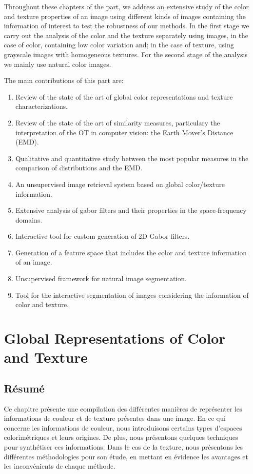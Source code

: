 Throughout these chapters of the part, we address an extensive study of the color and texture properties of an image using different kinds of images containing the information of interest to test the robustness of our methods. In the first stage we carry out the analysis of the color and the texture separately using images, in the case of color, containing low color variation and; in the case of texture, using grayscale images with homogeneous textures. For the second stage of the analysis we mainly use natural color images. 

The main contributions of this part are:

\begin{enumerate}
	\item Review of the state of the art of global color representations and texture characterizations.
	\item Review of the state of the art of similarity measures, particulary the interpretation of the OT in computer vision: the Earth Mover's Distance (EMD).
	\item Qualitative and quantitative study between the most popular measures in the comparison of distributions and the EMD. 
	\item An unsupervised image retrieval system based on global color/texture information.
	\item Extensive analysis of gabor filters and their properties in the space-frequency domains.
	\item Interactive tool for custom generation of 2D Gabor filters.
	\item Generation of a feature space that includes the color and texture information of an image.
	\item Unsupervised framework for natural image segmentation.
	\item Tool for the interactive segmentation of images considering the information of color and texture.
\end{enumerate}


\chapter{Global Representations of Color and Texture } \label{ch:color_texure_representations}

\section*{Résumé}
\noindent 
Ce chapitre présente une compilation des différentes manières de représenter les informations de couleur et de texture présentes dans une image. En ce qui concerne les informations de couleur, nous introduisons certains types d'espaces colorimétriques et leurs origines. De plus, nous présentons quelques techniques pour synthétiser ces informations. Dans le cas de la texture, nous présentons les différentes méthodologies pour son étude, en mettant en évidence les avantages et les inconvénients de chaque méthode.
